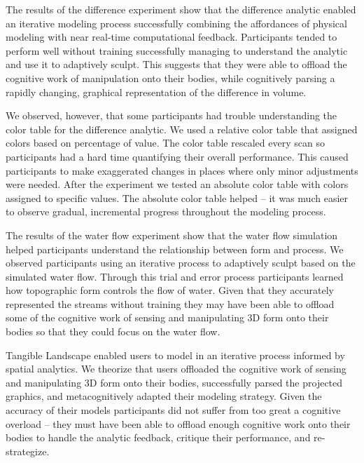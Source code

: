 \documentclass[prodmode,acmtochi]{acmsmall} %
\begin{document}
The results of the difference experiment show that 
the difference analytic 
enabled an iterative modeling process
successfully combining the affordances of physical modeling
with near real-time computational feedback. 
%
Participants tended to perform well without training 
successfully managing to %
understand the analytic
and use it to adaptively sculpt.
%
This suggests that they were able to offload the cognitive work 
of manipulation onto their bodies, while cognitively 
parsing a rapidly changing, graphical representation of the difference in volume.

We observed, however, that some participants had trouble understanding
the color table for the difference analytic. 
We used a relative color table 
that assigned colors based on percentage of value.
The color table rescaled every scan 
so participants had a hard time quantifying their overall performance.
This caused participants to make exaggerated changes in places
where only minor adjustments were needed.
%
After the experiment we tested an absolute color table
with colors assigned to specific values.
The absolute color table helped -- it was much easier 
to observe gradual, incremental progress throughout the modeling process.

The results of the water flow experiment show 
that the water flow simulation helped participants 
understand the relationship between form and process.
We observed participants using an iterative process
to adaptively sculpt based on the simulated water flow. 
Through this trial and error process 
participants learned how
topographic form controls the flow of water.
%
Given that they accurately represented the streams without training
they may have been able to offload 
some of the cognitive work of sensing and manipulating 
3D form onto their bodies so that 
they could focus on the water flow. 

Tangible Landscape enabled users 
to model in an iterative process informed by spatial analytics. %
%
We theorize that users offloaded the cognitive work 
of sensing and manipulating 3D form onto their bodies,
successfully parsed the projected graphics,
and metacognitively adapted their modeling strategy.
%
Given the accuracy of their models 
participants did not suffer from too great a cognitive overload 
-- they must have been able to offload enough cognitive work onto their bodies
to handle the analytic feedback, critique their performance, and re-strategize.
\end{document}
